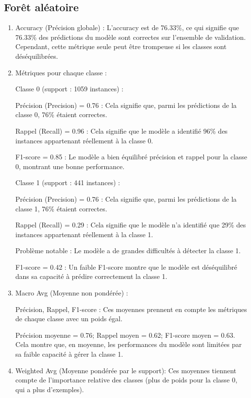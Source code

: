 \subsection{Forêt aléatoire}
\begin{flushleft}
\begin{enumerate}

\item Accuracy (Précision globale) :
L'accuracy est de 76.33\%, ce qui signifie que 76.33\% des prédictions du modèle sont correctes sur l'ensemble de validation. Cependant, cette métrique seule peut être trompeuse si les classes sont déséquilibrées.

\item Métriques pour chaque classe :

Classe 0 (support : 1059 instances) :

Précision (Precision) = 0.76 : 
Cela signifie que, parmi les prédictions de la classe 0, 76\% étaient correctes.

Rappel (Recall) = 0.96 : 
Cela signifie que le modèle a identifié 96\% des instances appartenant réellement à la classe 0.

F1-score = 0.85 : 
Le modèle a bien équilibré précision et rappel pour la classe 0, montrant une bonne performance.

Classe 1 (support : 441 instances)  :

Précision (Precision) = 0.76 :
Cela signifie que, parmi les prédictions de la classe 1, 76\% étaient correctes.

Rappel (Recall) = 0.29 :
Cela signifie que le modèle n'a identifié que 29\% des instances appartenant réellement à la classe 1.

Problème notable : Le modèle a de grandes difficultés à détecter la classe 1.

F1-score = 0.42 :
Un faible F1-score montre que le modèle est déséquilibré dans sa capacité à prédire correctement la classe 1.

\item Macro Avg (Moyenne non pondérée) :

Précision, Rappel, F1-score :
Ces moyennes prennent en compte les métriques de chaque classe avec un poids égal.

Précision moyenne = 0.76; Rappel moyen = 0.62; F1-score moyen = 0.63.
Cela montre que, en moyenne, les performances du modèle sont limitées par sa faible capacité à gérer la classe 1.


\item Weighted Avg (Moyenne pondérée par le support):
Ces moyennes tiennent compte de l'importance relative des classes (plus de poids pour la classe 0, qui a plus d'exemples).


\end{enumerate}
\end{flushleft}
